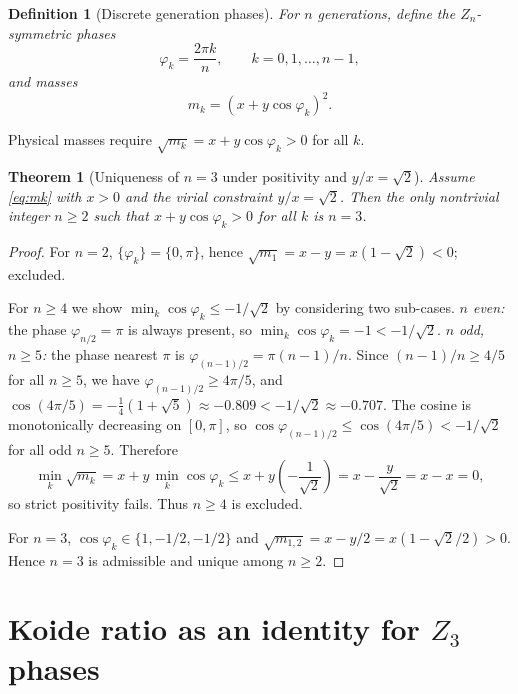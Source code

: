 \documentclass[12pt,a4paper]{article}
\newtheorem{definition}{Definition}
\newtheorem{theorem}{Theorem}
\begin{document}
\begin{definition}[Discrete generation phases]
For $n$ generations, define the $Z_n$-symmetric phases
\begin{equation}
\varphi_k = \frac{2\pi k}{n},\qquad k=0,1,\dots,n-1,
\label{eq:phik}
\end{equation}
and masses
\begin{equation}
m_k = \left(x+y\cos\varphi_k\right)^2.
\label{eq:mk}
\end{equation}
\end{definition}

Physical masses require $\sqrt{m_k}=x+y\cos\varphi_k>0$ for all $k$.

\begin{theorem}[Uniqueness of $n=3$ under positivity and $y/x=\sqrt{2}$]
\label{thm:n3}
Assume \eqref{eq:mk} with $x>0$ and the virial constraint $y/x=\sqrt{2}$.
Then the only nontrivial integer $n\ge 2$ such that $x+y\cos\varphi_k>0$ for all $k$ is $n=3$.
\end{theorem}

\begin{proof}
For $n=2$, $\{\varphi_k\}=\{0,\pi\}$, hence $\sqrt{m_1}=x-y=x(1-\sqrt{2})<0$; excluded.

For $n\ge 4$ we show $\min_k\cos\varphi_k \le -1/\sqrt{2}$ by considering two sub-cases.
\emph{$n$ even:} the phase $\varphi_{n/2}=\pi$ is always present, so $\min_k\cos\varphi_k = -1 < -1/\sqrt{2}$.
\emph{$n$ odd, $n\ge 5$:} the phase nearest $\pi$ is $\varphi_{(n-1)/2}=\pi(n-1)/n$.
Since $(n-1)/n \ge 4/5$ for all $n\ge 5$, we have $\varphi_{(n-1)/2}\ge 4\pi/5$, and $\cos(4\pi/5)=-\tfrac{1}{4}(1+\sqrt{5})\approx -0.809 < -1/\sqrt{2}\approx -0.707$.
The cosine is monotonically decreasing on $[0,\pi]$, so $\cos\varphi_{(n-1)/2}\le\cos(4\pi/5)<-1/\sqrt{2}$ for all odd $n\ge 5$.
Therefore
\[
\min_k \sqrt{m_k} = x + y\,\min_k\cos\varphi_k \le x + y\left(-\frac{1}{\sqrt{2}}\right)=x-\frac{y}{\sqrt{2}}=x-x=0,
\]
so strict positivity fails. Thus $n\ge 4$ is excluded.

For $n=3$, $\cos\varphi_k\in\{1,-1/2,-1/2\}$ and
$\sqrt{m_{1,2}}=x-y/2=x(1-\sqrt{2}/2)>0$.
Hence $n=3$ is admissible and unique among $n\ge 2$.
\end{proof}

\section{Koide ratio as an identity for $Z_3$ phases}
\label{sec:koide}
\end{document}
